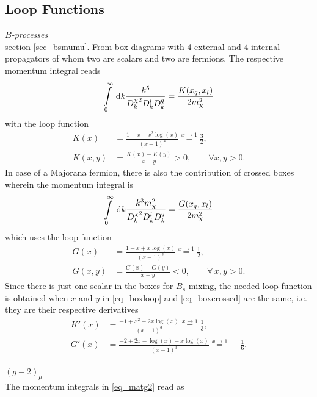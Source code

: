 \begin{appendix}
 \section{Loop Functions}
\label{sec_appendix}
\textit{$B$-processes}\\
\noindent section \ref{sec_bsmumu}. From box diagrams with 4 external and 4 internal propagators of whom two are scalars and two are fermions.
The respective momentum integral reads
\begin{align}
 \int\limits_0^\infty \; \mathrm{d} k \frac{k^5}{{D^\chi_k}^2D^l_k D^q_k} = \frac{K(x_q,x_l)}{2 m_\chi^2}
\end{align}
with the loop function \cite{Grip}
\begin{align}
 K(x)&=\frac{1-x+x^2\log(x)}{(x-1)^2} \stackrel{x\rightarrow 1}{=} \frac32, \\
 K(x,y) &= \frac{K(x)-K(y)}{x-y} > 0, \qquad\forall x,y > 0.
 \label{eq_boxloop}
\end{align}
In case of a Majorana fermion, there is also the contribution of crossed boxes wherein the momentum integral is 
\begin{align}
\int\limits_0^\infty \; \mathrm{d} k \frac{k^3  m_\chi^2}{{D^\chi_k}^2D^l_k D^q_k} = \frac{G(x_q,x_l)}{2m_\chi^2}
 \label{eq_crossedBox}
\end{align}
which uses the loop function
\begin{align}
 G(x)&=\frac{1-x+x\log(x)}{(x-1)^2} \stackrel{x\rightarrow 1}{=} \frac12,\\
 G(x,y) &= \frac{G(x)-G(y)}{x-y} < 0,\qquad \forall\, x,y>0.
 \label{eq_boxcrossed}
\end{align}
Since there is just one scalar in the boxes for $B_s$-mixing, the needed loop function is obtained when $x$ and $y$ in \eqref{eq_boxloop} and 
\eqref{eq_boxcrossed} are the same, i.e. they are their respective derivatives
\begin{align}
 K'(x)&=\frac{-1+x^2-2x\log(x)}{(x-1)^3} \stackrel{x\rightarrow 1}{=} \frac13,\\
 G'(x)&=\frac{-2+2x-\log(x)-x\log(x)}{(x-1)^3} \stackrel{x\rightarrow 1}{=} -\frac16.
 \label{eq_mixloops}
\end{align}
\\ $(g-2)_\mu$\\
\noindent 
The momentum integrals in \eqref{eq_matg2} read as


\end{appendix}
